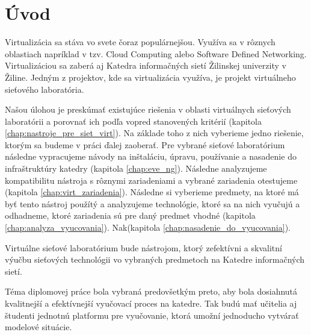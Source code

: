 \chapter*{Úvod}

Virtualizácia sa stáva vo svete čoraz populárnejšou. Využíva sa v rôznych oblastiach napríklad v tzv. Cloud Computing alebo Software Defined Networking. Virtualizáciou sa zaberá aj Katedra informačných sietí Žilinskej univerzity v Žiline. Jedným z projektov, kde sa virtualizácia využíva, je projekt virtuálneho sieťového laboratória. 

Našou úlohou je preskúmať existujúce riešenia v oblasti virtuálnych sieťových laboratórii a porovnať ich podľa vopred stanovených kritérií (kapitola \ref{chap:nastroje_pre_siet_virt}). Na základe toho z nich vyberieme jedno riešenie, ktorým sa budeme v práci ďalej zaoberať. Pre vybrané sieťové laboratórium následne vypracujeme návody na inštaláciu, úpravu, používanie a nasadenie do infraštruktúry katedry (kapitola \ref{chap:eve_ng}). Následne analyzujeme kompatibilitu nástroja s rôznymi zariadeniami a vybrané zariadenia otestujeme (kapitola \ref{chap:virt_zariadenia}). Následne si vyberieme predmety, na ktoré má byť tento nástroj použítý a analyzujeme technológie, ktoré sa na nich vyučujú a odhadneme, ktoré zariadenia sú pre daný predmet vhodné (kapitola \ref{chap:analyza_vyucovania}). Nak(kapitola \ref{chap:nasadenie_do_vyucovania}).

Virtuálne sieťové laboratórium bude nástrojom, ktorý zefektívni a skvalitní výučbu sieťových technológii vo vybraných predmetoch na Katedre informačných sietí.

Téma diplomovej práce bola vybraná predovšetkým preto, aby bola dosiahnutá kvalitnejší a efektívnejší vyučovací proces na katedre. Tak budú mať učitelia aj študenti jednotnú platformu pre vyučovanie, ktorá umožní jednoducho vytvárať modelové situácie.